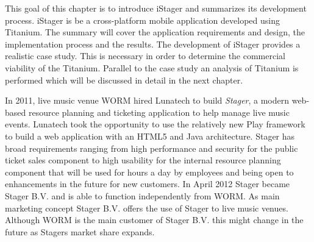 This goal of this chapter is to introduce iStager and summarizes its development process. iStager is be a cross-platform mobile application developed using Titanium. The summary will cover the application requirements and design, the implementation process and the results. 
The development of iStager provides a realistic case study. This is necessary in order to determine the commercial viability of the Titanium. Parallel to the case study an analysis of Titanium is performed which will be discussed in detail in the next chapter.






In 2011, live music venue WORM hired Lunatech to build \emph{Stager}, a modern web-based resource planning and ticketing application to help manage live music events. Lunatech took the opportunity to use the relatively new Play framework to build a web application with an HTML5 and Java architecture. Stager has broad requirements ranging from high performance and security for the public ticket sales component to high usability for the internal resource planning component that will be used for hours a day by employees and being open to enhancements in the future for new customers. \cite{Lunatech2011} In April 2012 Stager became Stager B.V. and is able to function independently from WORM. As main marketing concept Stager B.V. offers the use of Stager  to live music venues. Although WORM is the main customer of Stager B.V. this might change in the future as Stagers market share expands. 

